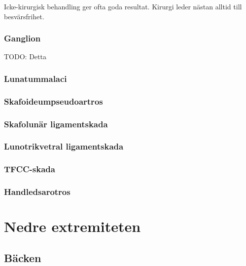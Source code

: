 \documentclass[
  letterpaper,
  DIV=11,
  numbers=noendperiod]{scrreport}
\begin{document}
Icke-kirurgisk behandling ger ofta goda resultat. Kirurgi leder nästan
alltid till besvärsfrihet.

\hypertarget{ganglion}{%
\subsection{Ganglion}\label{ganglion}}

TODO: Detta

\hypertarget{lunatummalaci}{%
\subsection{Lunatummalaci}\label{lunatummalaci}}

\hypertarget{skafoideumpseudoartros}{%
\subsection{Skafoideumpseudoartros}\label{skafoideumpseudoartros}}

\hypertarget{skafolunuxe4r-ligamentskada}{%
\subsection{Skafolunär
ligamentskada}\label{skafolunuxe4r-ligamentskada}}

\hypertarget{lunotrikvetral-ligamentskada}{%
\subsection{Lunotrikvetral
ligamentskada}\label{lunotrikvetral-ligamentskada}}

\hypertarget{tfcc-skada}{%
\subsection{TFCC-skada}\label{tfcc-skada}}

\hypertarget{handledsarotros}{%
\subsection{Handledsarotros}\label{handledsarotros}}

\hypertarget{nedre-extremiteten}{%
\chapter{Nedre extremiteten}\label{nedre-extremiteten}}

\hypertarget{buxe4cken}{%
\section{Bäcken}\label{buxe4cken}}
\end{document}
